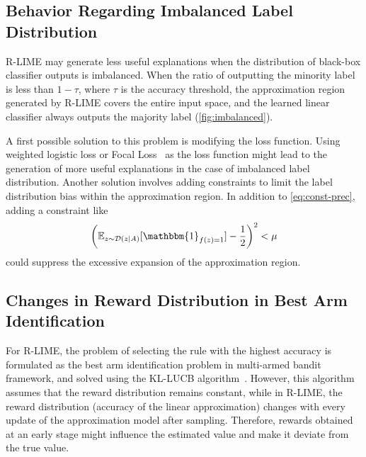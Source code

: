 \documentclass[runningheads]{llncs}
\begin{document}
{\subsection{Behavior Regarding Imbalanced Label Distribution}
R-LIME may generate less useful explanations
when the distribution of black-box classifier outputs is imbalanced.
When the ratio of outputting the minority label is less than $1-\tau$,
where $\tau$ is the accuracy threshold,
the approximation region generated by R-LIME covers the entire input space,
and the learned linear classifier always outputs the majority label
(\cref{fig:imbalanced}).

A first possible solution to this problem is modifying the loss function.
Using weighted logistic loss or Focal Loss~\cite{lin2020focal}
as the loss function might lead to the generation of more useful explanations
in the case of imbalanced label distribution.
Another solution involves adding constraints
to limit the label distribution bias within the approximation region.
In addition to \cref{eq:const-prec}, adding a constraint like
\begin{equation}
  {%
    \left(
    \mathbb{E}_{z\sim\mathcal{D}(z\mid A)}[\mathbbm{1}_{f(z)=1}]-\frac{1}{2}
    \right)
  }^2<\mu
\end{equation}
could suppress the excessive expansion of the approximation region.

\subsection{Changes in Reward Distribution in Best Arm Identification}\label{sec:reward}
{%
  \renewcommand{\arraystretch}{1.1}
  \begin{table}[tbp]
    \centering
    \caption[Deviation between the estimated accuracy and the true accuracy]{%
      Deviation between the estimated accuracy and the true accuracy
      of the linear classifier learned by R-LIME\@.
      The deviation $0.012\pm0.017$ was relatively small
      considering the confidence level $1-\delta=0.95$.
    }\label{tab:reward}
    
  \end{table}
}
For R-LIME,
the problem of selecting the rule with the highest accuracy is formulated
as the best arm identification problem in multi-armed bandit framework,
and solved using the KL-LUCB algorithm~\cite{kaufmann2013information}.
However, this algorithm assumes that the reward distribution remains constant,
while in R-LIME,
the reward distribution (accuracy of the linear approximation)
changes with every update of the approximation model after sampling.
Therefore, rewards obtained at an early stage
might influence the estimated value and
make it deviate from the true value.

}
\end{document}
